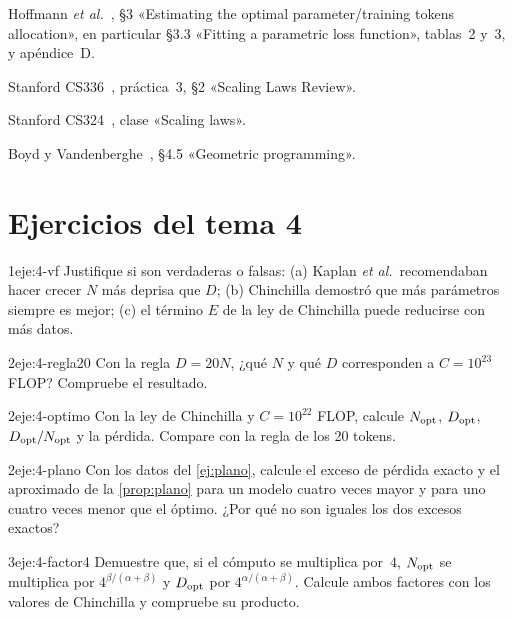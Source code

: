 \begin{lecturas}
\item Hoffmann \emph{et al.}~\cite{hoffmann}, §3 «Estimating the optimal parameter/training tokens allocation», en particular §3.3 «Fitting a parametric loss function», tablas~2 y~3, y apéndice~D.
\item Stanford CS336~\cite{cs336a3}, práctica~3, §2 «Scaling Laws Review».
\item Stanford CS324~\cite{cs324}, clase «Scaling laws».
\item Boyd y Vandenberghe~\cite{bv}, §4.5 «Geometric programming».
\end{lecturas}

\section*{Ejercicios del tema 4}

\begin{ejercicio}{1}{eje:4-vf}
Justifique si son verdaderas o falsas: (a) Kaplan \emph{et al.}\ recomendaban hacer crecer $N$ más deprisa que $D$; (b) Chinchilla demostró que más parámetros siempre es mejor; (c) el término $E$ de la ley de Chinchilla puede reducirse con más datos.
\end{ejercicio}

\begin{ejercicio}{2}{eje:4-regla20}
Con la regla $D=20N$, ¿qué $N$ y qué $D$ corresponden a $C=10^{23}$ FLOP? Compruebe el resultado.
\end{ejercicio}

\begin{ejercicio}{2}{eje:4-optimo}
Con la ley de Chinchilla y $C=10^{22}$ FLOP, calcule $N_{\mathrm{opt}}$, $D_{\mathrm{opt}}$, $D_{\mathrm{opt}}/N_{\mathrm{opt}}$ y la pérdida. Compare con la regla de los 20 tokens.
\end{ejercicio}

\begin{ejercicio}{2}{eje:4-plano}
Con los datos del \cref{ej:plano}, calcule el exceso de pérdida exacto y el aproximado de la \cref{prop:plano} para un modelo cuatro veces mayor y para uno cuatro veces menor que el óptimo. ¿Por qué no son iguales los dos excesos exactos?
\end{ejercicio}

\begin{ejercicio}{3}{eje:4-factor4}
Demuestre que, si el cómputo se multiplica por~$4$, $N_{\mathrm{opt}}$ se multiplica por $4^{\beta/(\alpha+\beta)}$ y $D_{\mathrm{opt}}$ por $4^{\alpha/(\alpha+\beta)}$. Calcule ambos factores con los valores de Chinchilla y compruebe su producto.
\end{ejercicio}

